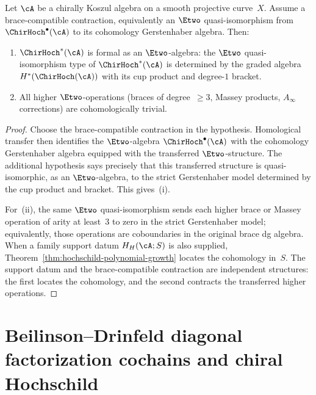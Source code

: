 \medskip

\begin{proposition}
\label{prop:e2-formality-hochschild}
Let $\cA$ be a chirally Koszul algebra on a smooth projective
curve~$X$. Assume a brace-compatible contraction, equivalently an
$\Etwo$ quasi-isomorphism from $\ChirHoch^\bullet(\cA)$ to its
cohomology Gerstenhaber algebra. Then:
\begin{enumerate}[label=\textup{(\roman*)}]
\item $\ChirHoch^*(\cA)$ is formal as an $\Etwo$-algebra:
 the $\Etwo$ quasi-isomorphism type of $\ChirHoch^*(\cA)$ is
 determined by the graded algebra $H^*(\ChirHoch(\cA))$ with its
 cup product and degree-$1$ bracket.

\item All higher $\Etwo$-operations \textup{(}braces of
 degree~$\geq 3$, Massey products, $A_\infty$ corrections\textup{)}
 are cohomologically trivial.
\end{enumerate}
\end{proposition}

\begin{proof}
Choose the brace-compatible contraction in the hypothesis. Homological
transfer then identifies the $\Etwo$-algebra
$\ChirHoch^\bullet(\cA)$ with the cohomology Gerstenhaber algebra
equipped with the transferred $\Etwo$-structure. The additional
hypothesis says precisely that this transferred structure is
quasi-isomorphic, as an $\Etwo$-algebra, to the strict Gerstenhaber
model determined by the cup product and bracket. This gives~(i).

For~(ii), the same $\Etwo$ quasi-isomorphism sends each higher brace
or Massey operation of arity at least~$3$ to zero in the strict
Gerstenhaber model; equivalently, those operations are coboundaries in
the original brace dg algebra.  When a family support datum
$H_H(\cA;S)$ is also supplied,
Theorem~\ref{thm:hochschild-polynomial-growth} locates the cohomology
in~$S$.  The support datum and the brace-compatible contraction are
independent structures: the first locates the cohomology, and the
second contracts the transferred higher operations.
\end{proof}

\section{Beilinson--Drinfeld diagonal factorization cochains and
chiral Hochschild}
\label{sec:bd-fact-vs-chirhoch}


